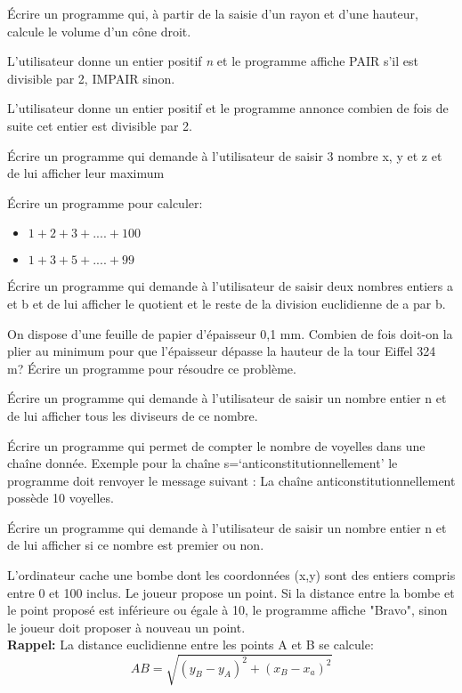 \documentclass[a4paper,11pt]{article}
\begin{document}
\begin{Form}
\begin{exo}
Écrire un programme qui, à partir de la saisie d'un rayon et d'une hauteur, calcule le volume d'un cône droit.
\end{exo}
\begin{exo}
L'utilisateur donne un entier positif \emph{n} et le programme affiche PAIR s'il est divisible par 2, IMPAIR sinon.
\end{exo}
\begin{exo}
L'utilisateur donne un entier positif et le programme annonce combien de fois de suite cet entier est divisible par 2.
\end{exo}
\begin{exo}
Écrire un programme qui demande à l’utilisateur de saisir 3 nombre x, y et z et de lui afficher leur maximum
\end{exo}
\begin{exo}
Écrire un programme pour calculer:
\begin{itemize}
\item $1+2+3+....+100$
\item $1+3+5+....+99$
\end{itemize}
\end{exo}
\begin{exo}
Écrire un programme qui demande à l’utilisateur de saisir deux nombres entiers a et b et de lui afficher le quotient et le reste de la division euclidienne de a par b.
\end{exo}
\begin{exo}
On dispose d'une feuille de papier d'épaisseur 0,1 mm.
Combien de fois doit-on la plier au minimum pour que l'épaisseur dépasse la hauteur de la tour Eiffel 324 m?
Écrire un programme pour résoudre ce problème. 
\end{exo}
\begin{exo}
Écrire un programme qui demande à l’utilisateur de saisir un nombre entier n et de lui afficher tous les diviseurs de ce nombre.
\end{exo}
\begin{exo}
Écrire un programme qui permet de compter le nombre de voyelles dans une chaîne donnée. Exemple pour la chaîne s=‘anticonstitutionnellement’ le programme doit renvoyer le message suivant : La chaîne anticonstitutionnellement possède 10 voyelles.
\end{exo}
\begin{exo}
Écrire un programme qui demande à l’utilisateur de saisir un nombre entier n et de lui afficher si ce nombre est premier ou non.
\end{exo}
\begin{exo}
L'ordinateur cache une bombe dont les coordonnées (x,y) sont des entiers compris entre 0 et 100 inclus.
Le joueur propose un point. Si la distance entre la bombe et le point proposé est inférieure ou égale à 10, le programme affiche "Bravo", sinon le joueur doit proposer à nouveau un point.\\
\textbf{Rappel:} La distance euclidienne entre les points A et B se calcule:
$$AB = \sqrt{(y_B-y_A)^2+(x_B-x_a)^2}$$
\end{exo}
\end{Form}
\end{document}
